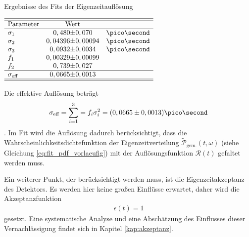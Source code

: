 \begin{table}[hptb]
\centering
\caption{Ergebnisse des Fits der Eigenzeitauflösung}
\label{tab:resolution}
$\begin{array}{l r@{\pm}l l}
\hline 
\hline
\text{Parameter} & \multicolumn{2}{c}{\text{Wert}}&\\
\hline
\sigma_{1} & 0,480 & 0,070 & \ps\\
\sigma_{2} & 0,04396 & 0,00094 & \ps\\
\sigma_{3} & 0,0932 & 0,0034 & \ps\\
f_{1} & 0,00329 & 0,00099\\
f_{2} & 0,739 & 0,027\\ \hline
\sigma_{\text{eff}} & 0,0665 & 0,0013 \\ \hline \hline
\end{array}$   
\end{table}
Die effektive Auflösung beträgt
\begin{align}
\sigma_{\text{eff}} = \sum_{i=1}^3 = f_i \sigma_i^2 = (0,0665\pm 0,0013)\ps
\end{align}.
Im Fit wird die Auflösung dadurch berücksichtigt, dass die Wahrscheinlichkeitsdichtefunktion der Eigenzeitverteilung $\widetilde{\mathcal{P}}_{\text{gem.}}(t, \omega)$ (siehe Gleichung \ref{eq:fit_pdf_vorlaeufig}) mit der Auflösungsfunktion $\mathcal{R}(t)$ gefaltet werden muss. 

Ein weiterer Punkt, der berücksichtigt werden muss, ist die Eigenzeitakzeptanz des Detektors. Es werden hier keine großen Einflüsse erwartet, daher wird die Akzeptanzfunktion 
\begin{align}
\epsilon(t) = 1
\end{align}
gesetzt. Eine systematische Analyse und eine Abschätzung des Einflusses dieser Vernachlässigung findet sich in Kapitel \ref{kap:akzeptanz}.

